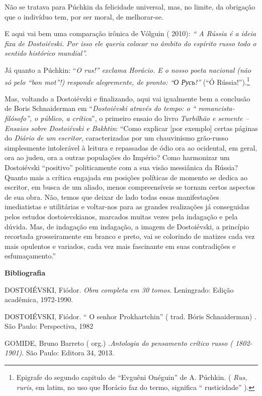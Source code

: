Não se tratava para Púchkin da felicidade universal, mas, no limite, da
obrigação que o indivíduo tem, por ser moral, de melhorar-se.

E aqui vai bem uma comparação irônica de Vólguin ( 2010): \emph{`` A
Rússia é a ideia fixa de Dostoiévski. Por isso ele queria colocar no
âmbito do espírito russo todo o sentido histórico mundial''.}

Já quanto a Púchkin: ``\emph{O rus!'' exclama Horácio. E o nosso poeta
nacional (não só pelo ``bon mot''!) responde alegremente, de pronto: ``О
Русь!''} (``Ó Rússia!'').\footnote{Epigrafe do segundo capitulo de
  ``Evguêni Onéguin'' de A. Púchkin. ( \emph{Rus, ruris}, em latim, no
  uso que Horácio faz do termo, significa `` rusticidade'' ).}

Mas, voltando a Dostoiévski e finalizando, aqui vai igualmente bem a
conclusão de Boris Schnaiderman em ``\emph{Dostoiévski através do tempo:
o `` romancista-filósofo'', o público, a crítica}'', o primeiro ensaio
do livro \emph{Turbilhão e semente -- Ensaios sobre Dostoiévski e
Bakhtin}: ``Como explicar {[}por exemplo{]} certas páginas do
\emph{Diário de um escritor}, caracterizadas por um chauvinismo
grão-russo simplesmente intolerável à leitura e repassadas de ódio ora
ao ocidental, em geral, ora ao judeu, ora a outras populações do
Império? Como harmonizar um Dostoiévski ``positivo'' politicamente com a
sua visão messiânica da Rússia? Quanto mais a crítica engajada em
posições políticas de momento se dedica ao escritor, em busca de um
aliado, menos compreensíveis se tornam certos aspectos de sua obra. Não,
temos que deixar de lado todas essas manifestações imediatistas e
utilitárias e voltar-nos para as grandes realizações já conseguidas
pelos estudos dostoievskianos, marcados muitas vezes pela indagação e
pela dúvida. Mas, de indagação em indagação, a imagem de Dostoiévski, a
princípio recortada grosseiramente em branco e preto, vai se colorindo
de matizes cada vez mais opulentos e variados, cada vez mais fascinante
em suas contradições e esfumaçamento.''

\textbf{Bibliografia}

DOSTOIÉVSKI, Fiódor. \emph{Obra completa em 30 tomos}. Leningrado:
Edição acadêmica, 1972-1990.

DOSTOIÉVSKI, Fiódor. `` O senhor Prokhartchin'' ( trad. Bóris
Schnaiderman) . São Paulo: Perspectiva, 1982

GOMIDE, Bruno Barreto ( org.) .\emph{Antologia do pensamento crítico
russo ( 1802-1901)}. São Paulo: Editora 34, 2013.

